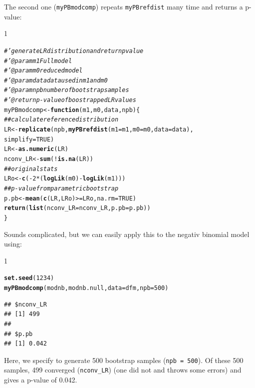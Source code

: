 \documentclass{scrartcl}\usepackage[]{graphicx}\usepackage[]{color}
\makeatletter
\newcommand{\hlnum}[1]{\textcolor[rgb]{0.686,0.059,0.569}{#1}}%
\newcommand{\hlcom}[1]{\textcolor[rgb]{0.678,0.584,0.686}{\textit{#1}}}%
\newcommand{\hlopt}[1]{\textcolor[rgb]{0,0,0}{#1}}%
\newcommand{\hlstd}[1]{\textcolor[rgb]{0.345,0.345,0.345}{#1}}%
\newcommand{\hlkwa}[1]{\textcolor[rgb]{0.161,0.373,0.58}{\textbf{#1}}}%
\newcommand{\hlkwb}[1]{\textcolor[rgb]{0.69,0.353,0.396}{#1}}%
\newcommand{\hlkwc}[1]{\textcolor[rgb]{0.333,0.667,0.333}{#1}}%
\newcommand{\hlkwd}[1]{\textcolor[rgb]{0.737,0.353,0.396}{\textbf{#1}}}%
\newenvironment{kframe}{%
 \def\at@end@of@kframe{}%
 \ifinner\ifhmode%
  \def\at@end@of@kframe{\end{minipage}}%
  \begin{minipage}{\columnwidth}%
 \fi\fi%
 \def\FrameCommand##1{\hskip\@totalleftmargin \hskip-\fboxsep
 \colorbox{shadecolor}{##1}\hskip-\fboxsep
     \hskip-\linewidth \hskip-\@totalleftmargin \hskip\columnwidth}%
 \MakeFramed {\advance\hsize-\width
   \@totalleftmargin\z@ \linewidth\hsize
   \@setminipage}}%
 {\par\unskip\endMakeFramed%
 \at@end@of@kframe}
\newenvironment{knitrout}{}{} %
\renewenvironment{knitrout}{\begin{spacing}{1}}{\end{spacing}}
\makeatother
\begin{document}
The second one (\texttt{myPBmodcomp}) repeats \texttt{myPBrefdist} many time and returns a p-value:
\begin{knitrout}
\color{fgcolor}\begin{kframe}
\begin{alltt}
\hlcom{#' generate LR distribution and return p value}
\hlcom{#' @param m1 Full model}
\hlcom{#' @param m0 reduced model}
\hlcom{#' @param data data used in m1 and m0}
\hlcom{#' @param npb number of bootstrap samples}
\hlcom{#' @return p-value of boostrapped LR values}
\hlstd{myPBmodcomp} \hlkwb{<-} \hlkwa{function}\hlstd{(}\hlkwc{m1}\hlstd{,} \hlkwc{m0}\hlstd{,} \hlkwc{data}\hlstd{,} \hlkwc{npb}\hlstd{)\{}
  \hlcom{## calculate reference distribution}
  \hlstd{LR} \hlkwb{<-} \hlkwd{replicate}\hlstd{(npb,} \hlkwd{myPBrefdist}\hlstd{(}\hlkwc{m1} \hlstd{= m1,} \hlkwc{m0} \hlstd{= m0,} \hlkwc{data} \hlstd{= data),}
                  \hlkwc{simplify} \hlstd{=} \hlnum{TRUE}\hlstd{)}
  \hlstd{LR} \hlkwb{<-} \hlkwd{as.numeric}\hlstd{(LR)}
  \hlstd{nconv_LR} \hlkwb{<-} \hlkwd{sum}\hlstd{(}\hlopt{!}\hlkwd{is.na}\hlstd{(LR))}
  \hlcom{## original stats}
  \hlstd{LRo} \hlkwb{<-} \hlkwd{c}\hlstd{(}\hlopt{-}\hlnum{2} \hlopt{*} \hlstd{(}\hlkwd{logLik}\hlstd{(m0)} \hlopt{-} \hlkwd{logLik}\hlstd{(m1)))}
  \hlcom{## p-value from parametric bootstrap}
  \hlstd{p.pb} \hlkwb{<-} \hlkwd{mean}\hlstd{(}\hlkwd{c}\hlstd{(LR, LRo)} \hlopt{>=} \hlstd{LRo,} \hlkwc{na.rm} \hlstd{=} \hlnum{TRUE}\hlstd{)}
  \hlkwd{return}\hlstd{(}\hlkwd{list}\hlstd{(}\hlkwc{nconv_LR} \hlstd{= nconv_LR,} \hlkwc{p.pb} \hlstd{= p.pb))}
\hlstd{\}}
\end{alltt}
\end{kframe}
\end{knitrout}


Sounds complicated, but we can easily apply this to the negativ binomial model using:
\begin{knitrout}
\color{fgcolor}\begin{kframe}
\begin{alltt}
\hlkwd{set.seed}\hlstd{(}\hlnum{1234}\hlstd{)}
\hlkwd{myPBmodcomp}\hlstd{(modnb, modnb.null,} \hlkwc{data} \hlstd{= dfm,} \hlkwc{npb} \hlstd{=} \hlnum{500}\hlstd{)}
\end{alltt}
\begin{verbatim}
## $nconv_LR
## [1] 499
## 
## $p.pb
## [1] 0.042
\end{verbatim}
\end{kframe}
\end{knitrout}
Here, we specify to generate 500 bootstrap samples (\texttt{npb = 500}).
Of these 500 samples, 499 converged (\texttt{nconv\_LR}) (one did not and throws some errors) and gives a p-value of 0.042.
\end{document}
